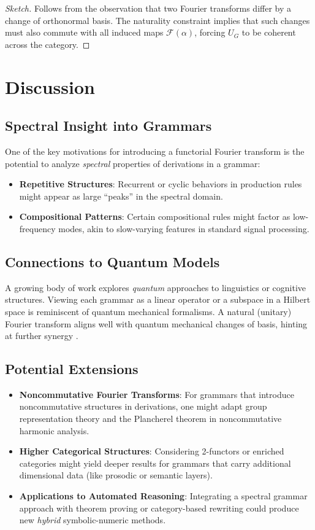 \documentclass[11pt]{article}
\begin{document}
\begin{proof}[Sketch]
Follows from the observation that two Fourier transforms differ by a change of orthonormal basis. The naturality constraint implies that such changes must also commute with all induced maps \(\mathcal{F}(\alpha)\), forcing $U_G$ to be coherent across the category.
\end{proof}

\section{Discussion}

\subsection{Spectral Insight into Grammars}

One of the key motivations for introducing a functorial Fourier transform is the potential to analyze \emph{spectral} properties of derivations in a grammar:
\begin{itemize}
    \item \textbf{Repetitive Structures}: Recurrent or cyclic behaviors in production rules might appear as large ``peaks'' in the spectral domain.
    \item \textbf{Compositional Patterns}: Certain compositional rules might factor as low-frequency modes, akin to slow-varying features in standard signal processing.
\end{itemize}

\subsection{Connections to Quantum Models}

A growing body of work explores \emph{quantum} approaches to linguistics or cognitive structures. Viewing each grammar as a linear operator or a subspace in a Hilbert space is reminiscent of quantum mechanical formalisms. A natural (unitary) Fourier transform aligns well with quantum mechanical changes of basis, hinting at further synergy \cite{abramskyCoecke}.

\subsection{Potential Extensions}

\begin{itemize}
    \item \textbf{Noncommutative Fourier Transforms}: For grammars that introduce noncommutative structures in derivations, one might adapt group representation theory and the Plancherel theorem in noncommutative harmonic analysis.
    \item \textbf{Higher Categorical Structures}: Considering 2-functors or enriched categories might yield deeper results for grammars that carry additional dimensional data (like prosodic or semantic layers).
    \item \textbf{Applications to Automated Reasoning}: Integrating a spectral grammar approach with theorem proving or category-based rewriting could produce new \emph{hybrid} symbolic-numeric methods.
\end{itemize}
\end{document}
